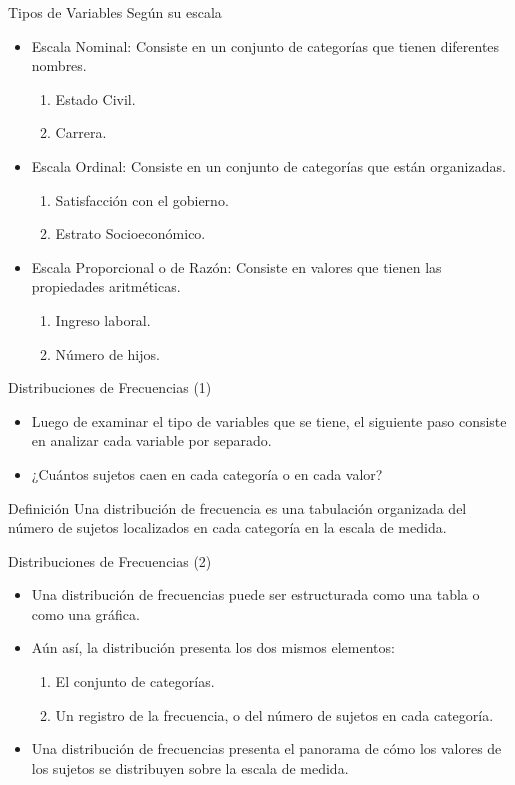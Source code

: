 \documentclass[xcolor=dvipsnames]{beamer}
\begin{document}
\begin{frame}{Tipos de Variables}
	{\sc Según su escala}
\begin{itemize}
\justifying
\item Escala Nominal: Consiste en un conjunto de categorías que tienen diferentes nombres.	
\begin{enumerate}
\item Estado Civil.
\item Carrera.
\end{enumerate}
\item Escala Ordinal: Consiste en un conjunto de categorías que están organizadas.
\begin{enumerate}
	\item Satisfacción con el gobierno.
	\item Estrato Socioeconómico.
\end{enumerate}
\item Escala Proporcional o de Razón: 	Consiste en valores que tienen las propiedades aritméticas.
\begin{enumerate}
	\item Ingreso laboral.
	\item Número de hijos.
\end{enumerate}
\end{itemize}
\end{frame}

\begin{frame}{Distribuciones de Frecuencias (1)}
\begin{itemize}
\justifying
\item Luego de examinar el tipo de variables que se tiene, el siguiente paso consiste en analizar cada variable por separado. 
\item ¿Cuántos sujetos caen en cada categoría o en cada valor?
\end{itemize}

\begin{block}{Definición}
\centering
Una distribución de frecuencia es una tabulación organizada del número de sujetos localizados en cada categoría en la escala de medida. 
\end{block}
\end{frame}

\begin{frame}{Distribuciones de Frecuencias (2)}
\begin{itemize}
\justifying
\item Una distribución de frecuencias puede ser estructurada como una tabla o como una gráfica.
\item Aún así, la distribución presenta los dos mismos elementos:
\begin{enumerate}
	\justifying
\item El conjunto de categorías.
\item Un registro de la frecuencia, o del número de sujetos en cada categoría.
\end{enumerate}
\item Una distribución de frecuencias presenta el panorama de cómo los valores de los sujetos se distribuyen sobre la escala de medida. 
\end{itemize}
\end{frame}
\end{document}
